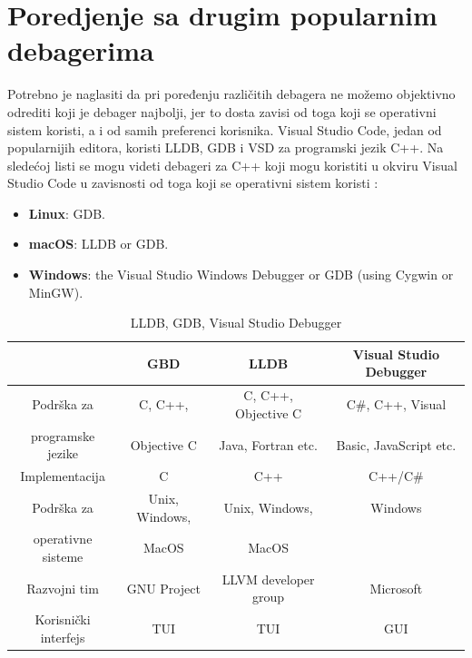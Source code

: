 \documentclass[a4paper]{article}
\begin{document}
\section{Poredjenje sa drugim popularnim debagerima}
\label{sec:naslovN}

Potrebno je naglasiti da pri poređenju različitih debagera ne možemo objektivno odrediti koji je debager najbolji, jer to dosta zavisi od toga koji se operativni sistem koristi, a i od samih preferenci korisnika. Visual Studio Code, jedan od popularnijih editora, koristi LLDB, GDB i VSD za programski jezik C++. Na sledećoj listi se mogu videti debageri za C++ koji mogu koristiti u okviru Visual Studio Code u zavisnosti od toga koji se operativni sistem koristi \cite{vsc_support}:
\begin{itemize}
	\item \textbf{Linux}: GDB.
	\item \textbf{macOS}: LLDB or GDB.
	\item \textbf{Windows}: the Visual Studio Windows Debugger or GDB (using Cygwin or MinGW).
\end{itemize}

\begin{table}[ht!]
	\begin{center}
		\caption{LLDB, GDB, Visual Studio Debugger \cite{gdb}\cite{lldb}\cite{vsd}}
		\label{table:tabela_poredjenje}
		\begin{footnotesize}
			\begin{tabular}{| c | c | c | c |}
				\hline
				& \cellcolor{red!60}GBD & \cellcolor{red!60}LLDB & \cellcolor{red!60}Visual Studio Debugger \\ 
				\hline
				\cellcolor{orange!60}Podrška za& \cellcolor{yellow!60}C, C++, & \cellcolor{yellow!60}C, C++, Objective C & \cellcolor{yellow!60}C\#, C++, Visual \\ 
				\cellcolor{orange!60}programske jezike & \cellcolor{yellow!60}Objective C & \cellcolor{yellow!60}Java, Fortran etc. & \cellcolor{yellow!60}Basic, JavaScript etc. \\ 
				\hline 
				\cellcolor{orange!60}Implementacija & \cellcolor{yellow!60}C & \cellcolor{yellow!60}C++ & \cellcolor{yellow!60}C++/C\# \\
				\hline
				\cellcolor{orange!60}Podrška za& \cellcolor{yellow!60}Unix, Windows,& \cellcolor{yellow!60}Unix, Windows,& \cellcolor{yellow!60}Windows\\
				\cellcolor{orange!60}operativne sisteme & \cellcolor{yellow!60}MacOS & \cellcolor{yellow!60}MacOS & \cellcolor{yellow!60}\\
				\hline
				\cellcolor{orange!60}Razvojni tim & \cellcolor{yellow!60}GNU Project & \cellcolor{yellow!60}LLVM developer group & \cellcolor{yellow!60}Microsoft \\
				\hline
				\cellcolor{orange!60}Korisnički interfejs & \cellcolor{yellow!60}TUI & \cellcolor{yellow!60}TUI & \cellcolor{yellow!60}GUI\\
				\hline
			\end{tabular}
		\end{footnotesize}
	\end{center}
\end{table}
\end{document}
